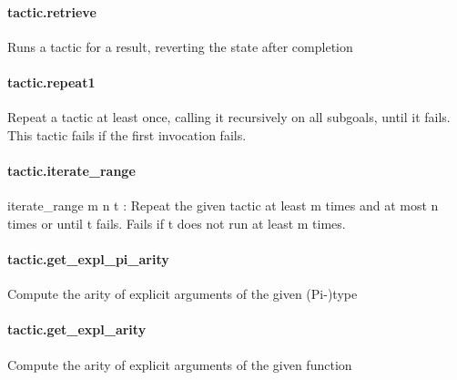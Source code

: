 \documentclass{article}
\begin{document}
\paragraph{tactic.retrieve}
\par
Runs a tactic for a result, reverting the state after completion
\paragraph{tactic.repeat1}
\par
Repeat a tactic at least once, calling it recursively on all subgoals,
until it fails. This tactic fails if the first invocation fails.
\paragraph{tactic.iterate\_range}
\par
\colorbox[RGB]{253,246,227}{{{{\color[RGB]{101, 123, 131} iterate\_range m n t }}}}: Repeat the given tactic at least 
\colorbox[RGB]{253,246,227}{{{{\color[RGB]{101, 123, 131} m }}}} times and
at most 
\colorbox[RGB]{253,246,227}{{{{\color[RGB]{101, 123, 131} n }}}} times or until 
\colorbox[RGB]{253,246,227}{{{{\color[RGB]{101, 123, 131} t }}}} fails. Fails if 
\colorbox[RGB]{253,246,227}{{{{\color[RGB]{101, 123, 131} t }}}} does not run at least m times.
\paragraph{tactic.get\_expl\_pi\_arity}
\par
Compute the arity of explicit arguments of the given (Pi-)type
\paragraph{tactic.get\_expl\_arity}
\par
Compute the arity of explicit arguments of the given function
\end{document}
